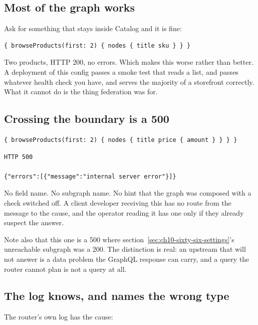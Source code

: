\subsection*{Most of the graph works}

Ask for something that stays inside Catalog and it is fine:

\begin{verbatim}
{ browseProducts(first: 2) { nodes { title sku } } }
\end{verbatim}

Two products, HTTP 200, no errors. Which makes this worse rather than better.
A deployment of this config passes a smoke test that reads a list, and passes
whatever health check you have, and serves the majority of a storefront
correctly. What it cannot do is the thing federation was for.

\subsection*{Crossing the boundary is a 500}

\begin{verbatim}
{ browseProducts(first: 2) { nodes { title price { amount } } } }
\end{verbatim}

\begin{verbatim}
HTTP 500

{"errors":[{"message":"internal server error"}]}
\end{verbatim}

%
No field name. No subgraph name. No hint that the graph was composed with a
check switched off. A client developer receiving this has no route from the
message to the cause, and the operator reading it has one only if they already
suspect the answer.

Note also that this one is a 500 where
section~\ref{sec:ch10-sixty-six-settings}'s unreachable subgraph was a 200. The
distinction is real: an upstream that will not answer is a data problem the
GraphQL response can carry, and a query the router cannot plan is not a query at
all.

\subsection*{The log knows, and names the wrong type}

The router's own log has the cause:

